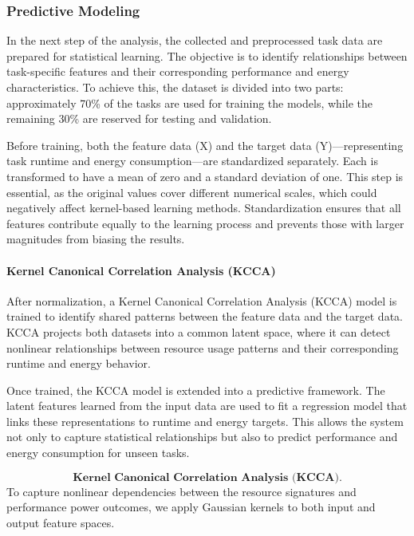 \subsubsection{Predictive Modeling}
\label{sec:predictive_modeling}


In the next step of the analysis, the collected and preprocessed task data are prepared for statistical learning. The objective is to identify relationships between task-specific features and their corresponding performance and energy characteristics. To achieve this, the dataset is divided into two parts: approximately 70\% of the tasks are used for training the models, while the remaining 30\% are reserved for testing and validation.

Before training, both the feature data (X) and the target data (Y)—representing task runtime and energy consumption—are standardized separately. Each is transformed to have a mean of zero and a standard deviation of one. This step is essential, as the original values cover different numerical scales, which could negatively affect kernel-based learning methods. Standardization ensures that all features contribute equally to the learning process and prevents those with larger magnitudes from biasing the results.

\paragraph{Kernel Canonical Correlation Analysis (KCCA)}
\label{sec:kcca}
After normalization, a Kernel Canonical Correlation Analysis (KCCA) model is trained to identify shared patterns between the feature data and the target data. KCCA projects both datasets into a common latent space, where it can detect nonlinear relationships between resource usage patterns and their corresponding runtime and energy behavior.

Once trained, the KCCA model is extended into a predictive framework. The latent features learned from the input data are used to fit a regression model that links these representations to runtime and energy targets. This allows the system not only to capture statistical relationships but also to predict performance and energy consumption for unseen tasks.

\[
    \textbf{Kernel Canonical Correlation Analysis (KCCA).}
\]
To capture nonlinear dependencies between the resource signatures
and performance power outcomes, we apply Gaussian kernels to both
input and output feature spaces.

